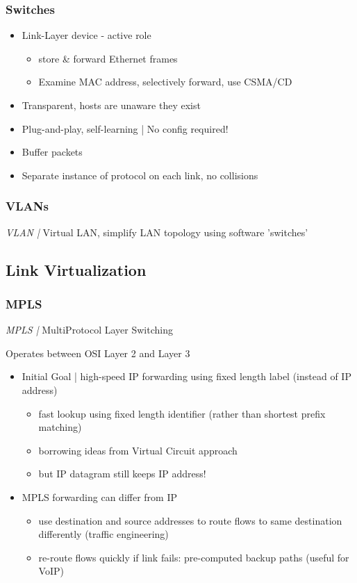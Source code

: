 \documentclass{article}
\newcommand{\define}[1]{\noindent\textit{#1 |}}
\begin{document}
\subsubsection*{Switches}

\begin{itemize}
	\item Link-Layer device - active role
	\begin{itemize}
		\item store \& forward Ethernet frames
		\item Examine MAC address, selectively forward, use CSMA/CD
	\end{itemize}
	\item Transparent, hosts are unaware they exist
	\item Plug-and-play, self-learning | No config required!
	\item Buffer packets
	\item Separate instance of protocol on each link, no collisions
\end{itemize}

\subsubsection*{VLANs}

\define{VLAN} Virtual LAN, simplify LAN topology using software 'switches'
	
\subsection{Link Virtualization}

\subsubsection*{MPLS}

\define{MPLS} MultiProtocol Layer Switching

Operates between OSI Layer 2 and Layer 3

\begin{itemize}
	\item Initial Goal | high-speed IP forwarding using fixed length label (instead of IP address)
	\begin{itemize}
		\item fast lookup using fixed length identifier (rather than shortest prefix matching)
		\item borrowing ideas from Virtual Circuit approach
		\item but IP datagram still keeps IP address!
	\end{itemize}
	\item MPLS forwarding can differ from IP
	\begin{itemize}
		\item use destination and source addresses to route flows to same destination differently (traffic engineering)
		\item re-route flows quickly if link fails: pre-computed backup paths (useful for VoIP)
	\end{itemize}
\end{itemize}
\end{document}
